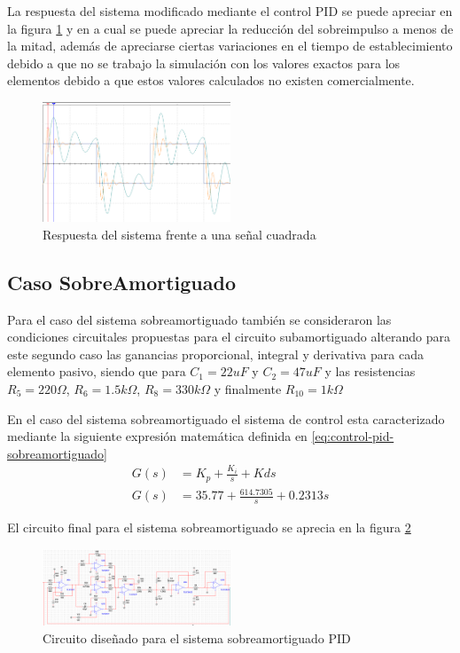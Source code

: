 \documentclass[conference]{IEEEtran}
\begin{document}
	La respuesta del sistema modificado mediante el control PID se puede apreciar en la figura \ref{fig:respuesta-circuito-sub} y en a cual se puede apreciar la reducción del sobreimpulso a menos de la mitad, además de apreciarse ciertas variaciones en el tiempo de establecimiento debido a que no se trabajo la simulación con los valores exactos para los elementos debido a que estos valores calculados no existen comercialmente.
	
	\begin{figure}[h]
		\centering
		\includegraphics[width=0.5\textwidth]{media1/respuesta-circuito-sub}
		\caption{Respuesta del sistema frente a una señal cuadrada}
		\label{fig:respuesta-circuito-sub}
	\end{figure}
	
	\subsection{Caso SobreAmortiguado}
	
	Para el caso del sistema sobreamortiguado también se consideraron las condiciones circuitales propuestas para el circuito subamortiguado alterando para este segundo caso las ganancias proporcional, integral y derivativa para cada elemento pasivo, siendo que para  $C_1 = 22uF$ y $C_2 = 47uF$ y las resistencias $R_5 = 220\Omega$, $R_6 = 1.5k\Omega$, $R_8 = 330k\Omega$ y finalmente $R_10 = 1k\Omega$
	
	En el caso del sistema sobreamortiguado el sistema de control esta caracterizado mediante la siguiente expresión matemática definida en \ref{eq:control-pid-sobreamortiguado}
	\begin{align}
		G(s) &= K_p +  \frac{K_i}{s} + Kds \\
		G(s) &= 35.77 +  \frac{614.7305}{s} + 0.2313s
		\label{eq:control-pid-sobreamortiguado}
	\end{align}
	
	El circuito final para el sistema sobreamortiguado se aprecia en la figura \ref{fig:circuito-sobreamortiguado}
	
	\begin{figure}[h]
		\centering
		\includegraphics[width=0.5\textwidth]{media1/circuito-sobreamortiguado}
		\caption{Circuito diseñado para el sistema sobreamortiguado PID}
		\label{fig:circuito-sobreamortiguado}
	\end{figure}
	
\end{document}
